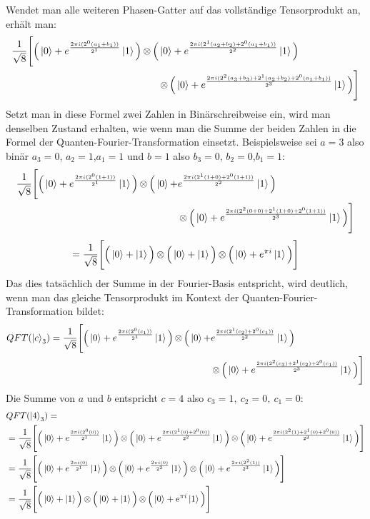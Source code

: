 Wendet man alle weiteren Phasen-Gatter auf das vollständige Tensorprodukt an, 
erhält man:
\begin{align*}
    \frac{1}{\sqrt{8}} 
    \Bigg[ 
      \Big(\ket{0} + { e^{\frac{2 \pi i (2^0(a_1+b_1))}{2^1}}}\ket{1} \Big) 
      \operatorname{\otimes}
      \Big( &\ket{0} + { e^{\frac{2 \pi i (2^1(a_2+b_2)+2^0(a_1+b_1))}{2^2}}}\ket{1} \Big)\\ 
      &\operatorname{\otimes}
      \Big( \ket{0} + { e^{\frac{2 \pi i (2^{2}(a_3+b_3) +2^1(a_2+b_2)+2^0(a_1+b_1))}{2^3}}}\ket{1} \Big) 
    \Bigg]
\end{align*}
Setzt man in diese Formel zwei Zahlen in Binärschreibweise ein, 
wird man denselben Zustand erhalten,
wie wenn man die Summe der beiden Zahlen in die Formel der Quanten-Fourier-Transformation einsetzt.
Beispielsweise sei \(a = 3\) also binär \(a_3 = 0\), \(a_2 = 1\),\(a_1 = 1\) und 
\(b = 1\) also \(b_3 = 0\), \(b_2 = 0\),\(b_1 = 1\):
\begin{align*}
\frac{1}{\sqrt{8}} 
\Bigg[ \Big(\ket{0} + { e^{\frac{2 \pi i (2^0(1+1))}{2^1}}}\ket{1} \Big) 
\operatorname{\otimes}
\Big( \ket{0} + &{ e^{\frac{2 \pi i (2^1(1+0)+2^0(1+1))}{2^2}}}\ket{1} \Big) \\
&\operatorname{\otimes}
\Big( \ket{0} + { e^{\frac{2 \pi i (2^{2}(0+0) +2^1(1+0)+2^0(1+1))}{2^3}}}\ket{1} \Big) 
\Bigg]
\end{align*}
\[
=\frac{1}{\sqrt{8}} 
\Bigg[ \Big(\ket{0} + \ket{1} \Big) \operatorname{\otimes}
\Big( \ket{0} +   \ket{1} \Big) \operatorname{\otimes}
\Big( \ket{0} +  e^{\pi i }\ket{1} \Big) 
\Bigg]
\]
Das dies tatsächlich der Summe in der Fourier-Basis entspricht, wird deutlich, 
wenn man das gleiche Tensorprodukt im Kontext der Quanten-Fourier-Transformation bildet:
\begin{align*}
    QFT(\ket{c}_3) = 
    \frac{1}{\sqrt{8}} 
    \Bigg[ \Big(\ket{0} + { e^{\frac{2 \pi i (2^0(c_1))}{2^1}}}\ket{1} \Big) 
    \operatorname{\otimes}
    \Big( \ket{0} + &{ e^{\frac{2 \pi i (2^1(c_2)+2^0(c_1))}{2^2}}}\ket{1} \Big) \\
    &\operatorname{\otimes}
    \Big( \ket{0} + { e^{\frac{2 \pi i (2^{2}(c_3) +2^1(c_2)+2^0(c_1))}{2^3}}}\ket{1} \Big) 
\Bigg]
\end{align*}
Die Summe von \(a\) und \(b\) entspricht \(c = 4\) also \(c_3 = 1,~c_2 = 0,~c_1=0\):
\begin{align*}
    &QFT(\ket{4}_3) = \\
    &= \frac{1}{\sqrt{8}} \Bigg[ \Big(\ket{0} + { e^{\frac{2 \pi i (2^0(0))}{2^1}}}\ket{1} \Big) 
    \operatorname{\otimes}
    \Big( \ket{0} + { e^{\frac{2 \pi i (2^1(0)+2^0(0))}{2^2}}}\ket{1} \Big) 
\operatorname{\otimes}
\Big( \ket{0} + { e^{\frac{2 \pi i (2^{2}(1) +2^1(0)+2^0(0))}{2^3}}}\ket{1} \Big) \Bigg] \\
    &= 
    \frac{1}{\sqrt{8}} \Bigg[ \Big(\ket{0} + { e^{\frac{2 \pi i (0)}{2^1}}}\ket{1} \Big) 
    \operatorname{\otimes}
    \Big( \ket{0} + { e^{\frac{2 \pi i (0)}{2^2}}}\ket{1} \Big) 
\operatorname{\otimes}
\Big( \ket{0} + { e^{\frac{2 \pi i (2^{2}(1))}{2^3}}}\ket{1} \Big) \Bigg] \\
&=\frac{1}{\sqrt{8}} \Bigg[ \Big(\ket{0} + \ket{1} \Big) 
\operatorname{\otimes}
\Big( \ket{0} +   \ket{1} \Big) 
\operatorname{\otimes}
\Big( \ket{0} +  e^{\pi i }\ket{1} \Big) \Bigg]
\end{align*}
